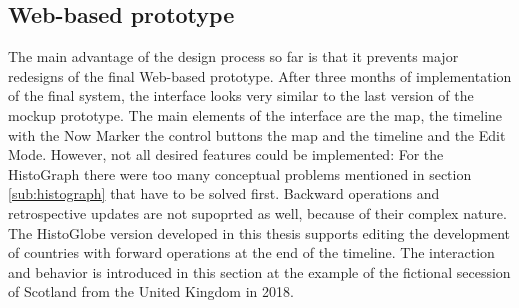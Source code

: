 
\subsection{Web-based prototype} %
\label{sub:web_based_prototype}

The main advantage of the design process so far is that it prevents major redesigns of the final Web-based prototype. After three months of implementation of the final system, the interface looks very similar to the last version of the mockup prototype. The main elements of the interface are the map, the timeline with the Now Marker the control buttons the map and the timeline and the Edit Mode. However, not all desired features could be implemented: For the HistoGraph there were too many conceptual problems mentioned in section \ref{sub:histograph} that have to be solved first. Backward operations and retrospective updates are not supoprted as well, because of their complex nature. The HistoGlobe version developed in this thesis supports editing the development of countries with forward operations at the end of the timeline. The interaction and behavior is introduced in this section at the example of the fictional secession of Scotland from the United Kingdom in 2018.

